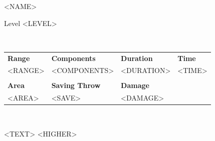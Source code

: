 \begin{figure}%
\begin{framed}

\begin{minipage}{0.5\textwidth}
    \huge
    <NAME>
\end{minipage}
\begin{minipage}{0.48\textwidth}
    \flushright
    Level <LEVEL>
\end{minipage}\\
\begin{flushright}
	\phantom{-}
	\begin{tabularx}{0.98\textwidth}{XXXl}
	    \textbf{Range} & \textbf{Components} & \textbf{Duration} & \textbf{Time}\phantom{--------------}\\
	    <RANGE> & <COMPONENTS> & <DURATION> & <TIME>%
	    \\	    
	    & & & \\
	    \textbf{Area} & \textbf{Saving Throw} & \textbf{Damage} & \\
	    <AREA> & <SAVE> & <DAMAGE> &
	\end{tabularx}\\
\end{flushright}
\smallskip
<TEXT>
<HIGHER>
\smallskip
\end{framed}
\end{figure}